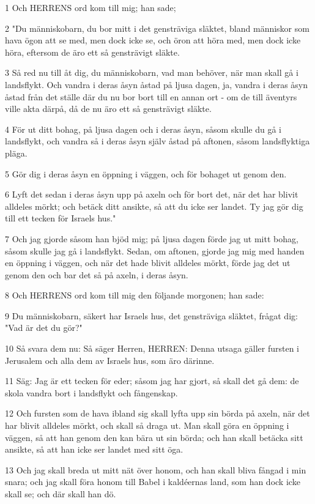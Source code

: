 \par 1 Och HERRENS ord kom till mig; han sade;
\par 2 "Du människobarn, du bor mitt i det gensträviga släktet, bland människor som hava ögon att se med, men dock icke se, och öron att höra med, men dock icke höra, eftersom de äro ett så gensträvigt släkte.
\par 3 Så red nu till åt dig, du människobarn, vad man behöver, när man skall gå i landsflykt. Och vandra i deras åsyn åstad på ljusa dagen, ja, vandra i deras åsyn åstad från det ställe där du nu bor bort till en annan ort - om de till äventyrs ville akta därpå, då de nu äro ett så gensträvigt släkte.
\par 4 För ut ditt bohag, på ljusa dagen och i deras åsyn, såsom skulle du gå i landsflykt, och vandra så i deras åsyn själv åstad på aftonen, såsom landsflyktiga pläga.
\par 5 Gör dig i deras åsyn en öppning i väggen, och för bohaget ut genom den.
\par 6 Lyft det sedan i deras åsyn upp på axeln och för bort det, när det har blivit alldeles mörkt; och betäck ditt ansikte, så att du icke ser landet. Ty jag gör dig till ett tecken för Israels hus."
\par 7 Och jag gjorde såsom han bjöd mig; på ljusa dagen förde jag ut mitt bohag, såsom skulle jag gå i landsflykt. Sedan, om aftonen, gjorde jag mig med handen en öppning i väggen, och när det hade blivit alldeles mörkt, förde jag det ut genom den och bar det så på axeln, i deras åsyn.
\par 8 Och HERRENS ord kom till mig den följande morgonen; han sade:
\par 9 Du människobarn, säkert har Israels hus, det gensträviga släktet, frågat dig: "Vad är det du gör?"
\par 10 Så svara dem nu: Så säger Herren, HERREN: Denna utsaga gäller fursten i Jerusalem och alla dem av Israels hus, som äro därinne.
\par 11 Säg: Jag är ett tecken för eder; såsom jag har gjort, så skall det gå dem: de skola vandra bort i landsflykt och fångenskap.
\par 12 Och fursten som de hava ibland sig skall lyfta upp sin börda på axeln, när det har blivit alldeles mörkt, och skall så draga ut. Man skall göra en öppning i väggen, så att han genom den kan bära ut sin börda; och han skall betäcka sitt ansikte, så att han icke ser landet med sitt öga.
\par 13 Och jag skall breda ut mitt nät över honom, och han skall bliva fångad i min snara; och jag skall föra honom till Babel i kaldéernas land, som han dock icke skall se; och där skall han dö.
